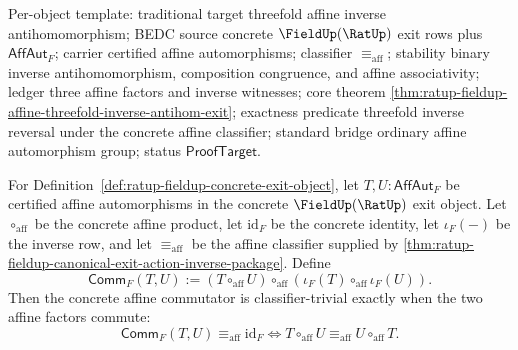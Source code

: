 Per-object template: traditional target threefold affine inverse
antihomomorphism; BEDC source concrete $\FieldUp(\RatUp)$ exit rows plus
$\mathsf{AffAut}_F$; carrier certified affine automorphisms; classifier
$\equiv_{\mathrm{aff}}$; stability binary inverse antihomomorphism, composition
congruence, and affine associativity; ledger three affine factors and inverse
witnesses; core theorem
\autoref{thm:ratup-fieldup-affine-threefold-inverse-antihom-exit}; exactness
predicate threefold inverse reversal under the concrete affine classifier;
standard bridge ordinary affine automorphism group; status
$\mathsf{ProofTarget}$.

\begin{theorem}
\label{thm:ratup-fieldup-affine-commutator-trivial-iff-commutes}
For Definition~\ref{def:ratup-fieldup-concrete-exit-object}, let
$T,U:\mathsf{AffAut}_F$ be certified affine automorphisms in the concrete
$\FieldUp(\RatUp)$ exit object. Let $\circ_{\mathrm{aff}}$ be the concrete
affine product, let $\mathrm{id}_F$ be the concrete identity, let
$\iota_F(-)$ be the inverse row, and let $\equiv_{\mathrm{aff}}$ be the
affine classifier supplied by
\autoref{thm:ratup-fieldup-canonical-exit-action-inverse-package}. Define
$$
\mathsf{Comm}_F(T,U):=(T\circ_{\mathrm{aff}}U)\circ_{\mathrm{aff}}
(\iota_F(T)\circ_{\mathrm{aff}}\iota_F(U)).
$$
Then the concrete affine commutator is classifier-trivial exactly when the
two affine factors commute:
$$
\mathsf{Comm}_F(T,U)\equiv_{\mathrm{aff}}\mathrm{id}_F
\Longleftrightarrow
T\circ_{\mathrm{aff}}U\equiv_{\mathrm{aff}}U\circ_{\mathrm{aff}}T.
$$
\end{theorem}
